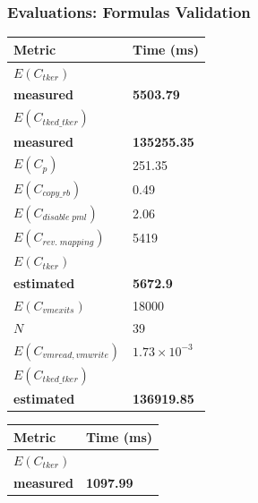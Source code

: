 \documentclass[xcolor=table,bigger,unknownkeysallowed]{beamer}
\begin{document}
\begin{frame}
	\frametitle{Evaluations: Formulas Validation}
	\begin{table}[h]
		\centering \scriptsize
		\begin{subtable}[b]{.45\textwidth}
			\centering 
			\begin{tabular}{l l}
				\toprule
				\hline
				Metric & Time (ms) \\
				\hline
				\textcolor{americanrose}{\textbf{$E(C_{tker})$}} & \\
				\textcolor{americanrose}{\textbf{measured}} & \multirow{-2}{*}{\textcolor{americanrose}{\textbf{5503.79}}}\\
				\textcolor{airforceblue}{\textbf{$E(C_{tked\_tker})$}} & \\
				\textcolor{airforceblue}{\textbf{measured}} & \multirow{-2}{*}{\textcolor{airforceblue}{\textbf{135255.35}}}\\
				\midrule
				$E(C_{p})$ & 251.35\\
				$E(C_{copy\_rb})$ & 0.49\\
				$E(C_{disable \; pml})$ & 2.06\\
				$E(C_{rev. \; mapping})$ & 5419 \\
				\textcolor{americanrose}{\textbf{$E(C_{tker})$}}  &\\
				\textcolor{americanrose}{\textbf{estimated}} &  \multirow{-2}{*}{\textcolor{americanrose}{\textbf{5672.9}}}\\
				\midrule
				$E(C_{vmexits})$ & 18000\\
				$N$ & 39\\
				$E(C_{vmread,vmwrite})$ & $1.73 \times 10^{-3}$\\
				\textcolor{airforceblue}{\textbf{$E(C_{tked\_tker})$}}  & \\
				\textcolor{airforceblue}{\textbf{estimated}} & \multirow{-2}{*}{\textcolor{airforceblue}{\textbf{136919.85}}}\\
				\bottomrule
			\end{tabular}
			\label{tab:criu-spml-formula}
		\end{subtable}
		\hfill
		\begin{subtable}[b]{.45\textwidth}
			\centering 
			\begin{tabular}{l l}
				\toprule
				\hline
				Metric & Time (ms) \\
				\hline
				\textcolor{americanrose}{\textbf{$E(C_{tker})$}} & \\
				\textcolor{americanrose}{\textbf{measured}} & \multirow{-2}{*}{\textcolor{americanrose}{\textbf{1097.99}}}\\

\end{tabular}
\end{subtable}
\end{table}
\end{frame}
\end{document}
